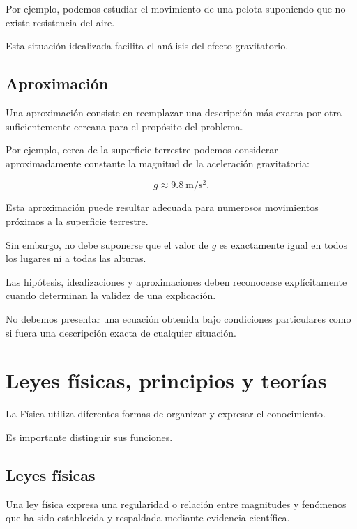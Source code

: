 Por ejemplo, podemos estudiar el movimiento
de una pelota suponiendo que no existe
resistencia del aire.

Esta situación idealizada facilita
el análisis del efecto gravitatorio.

\subsection{Aproximación}

Una aproximación consiste en reemplazar
una descripción más exacta por otra
suficientemente cercana para el propósito
del problema.

Por ejemplo, cerca de la superficie terrestre
podemos considerar aproximadamente constante
la magnitud de la aceleración gravitatoria:

\[g\approx\SI{9.8}{\meter\per\second\squared}.\]

Esta aproximación puede resultar adecuada
para numerosos movimientos próximos
a la superficie terrestre.

Sin embargo, no debe suponerse que
el valor de \(g\) es exactamente igual
en todos los lugares ni a todas las alturas.

\begin{advertencia}

Las hipótesis, idealizaciones y aproximaciones
deben reconocerse explícitamente cuando
determinan la validez de una explicación.

No debemos presentar una ecuación obtenida
bajo condiciones particulares como si fuera
una descripción exacta de cualquier situación.

\end{advertencia}


\section{Leyes físicas, principios y teorías}

La Física utiliza diferentes formas
de organizar y expresar el conocimiento.

Es importante distinguir sus funciones.

\subsection{Leyes físicas}

Una ley física expresa una regularidad
o relación entre magnitudes y fenómenos
que ha sido establecida y respaldada
mediante evidencia científica.

